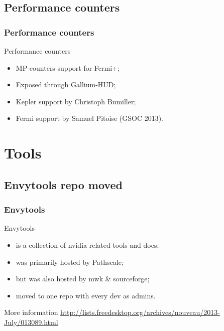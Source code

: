 \documentclass[11pt,english,compress]{beamer}
\begin{document}
\subsection{Performance counters}

\begin{frame}
	\frametitle{Performance counters}

	\begin{block}{Performance counters}
		\begin{itemize}
			\item MP-counters support for Fermi+;
			\item Exposed through Gallium-HUD;
			\item Kepler support by Christoph Bumiller;
			\item Fermi support by Samuel Pitoise (GSOC 2013).
		\end{itemize}
	\end{block}
\end{frame}

\section{Tools}

\subsection{Envytools repo moved}
\begin{frame}
	\frametitle{Envytools}

	\begin{block}{Envytools}
		\begin{itemize}
			\item is a collection of nvidia-related tools and docs;
			\item was primarily hosted by Pathscale;
			\item but was also hosted by mwk \& sourceforge;
			\item moved to one repo with every dev as admins.
		\end{itemize}
	\end{block}

	\begin{block}{More information}
		\url{http://lists.freedesktop.org/archives/nouveau/2013-July/013089.html}
	\end{block}
\end{frame}
\end{document}
